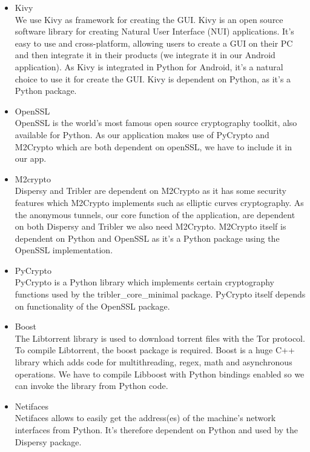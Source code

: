 		\begin{itemize}
		
			\item Kivy\\
			We use Kivy as framework for creating the GUI. Kivy is an open source software library for creating Natural User Interface (NUI) applications. It's easy to use and cross-platform, allowing users to create a GUI on their PC and then integrate it in their products (we integrate it in our Android application). As Kivy is integrated in Python for Android, it's a natural choice to use it for create the GUI. Kivy is dependent on Python, as it's a Python package. 
		
			\item OpenSSL\\
			OpenSSL is the world's most famous open source cryptography toolkit, also available for Python. As our application makes use of PyCrypto and M2Crypto which are both dependent on openSSL, we have to include it in our app.
		
			\item M2crypto\\
			Dispersy and Tribler are dependent on M2Crypto as it has some security features which M2Crypto implements such as elliptic curves cryptography. As the anonymous tunnels, our core function of the application, are dependent on both Dispersy and Tribler we also need M2Crypto. M2Crypto itself is dependent on Python and OpenSSL as it's a Python package using the OpenSSL implementation.
		
			\item PyCrypto\\
			PyCrypto is a Python library which implements certain cryptography functions used by the tribler\_core\_minimal package. PyCrypto itself depends on functionality of the OpenSSL package.
		
			\item Boost\\
			The Libtorrent library is used to download torrent files with the Tor protocol. To compile Libtorrent, the boost package is required. Boost is a huge C++ library which adds code for multithreading, regex, math and asynchronous operations. We have to compile Libboost with Python bindings enabled so we can invoke the library from Python code.
		
			\item Netifaces\\
			Netifaces allows to easily get the address(es) of the machine's network interfaces from Python. It's therefore dependent on Python and used by the Dispersy package.
		

\end{itemize}
